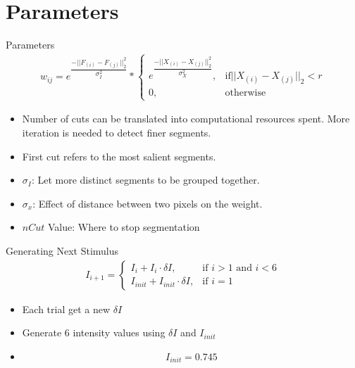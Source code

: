\documentclass[10pt,xcolor=svgnames]{beamer} %
\begin{document}
\section{Parameters}
\begin{frame}{Parameters}
    \begin{align}
        w_{ij} = e^{\dfrac{-||F_{(i)} - F_{(j)}||_2^2}{\sigma_I^2}}
        *
            \begin{cases}
            e^\dfrac{-||X_{(i)} - X_{(j)}||_2^2}{\sigma_X^2}, &  \text{if} ||X_{(i)} - X_{(j)}||_2 < r\\
            0,                                               &  \text{otherwise}
            \end{cases}
    \end{align}
    \begin{itemize}
        \item Number of cuts can be translated into computational resources spent. More iteration is needed to detect finer segments.
        \item First cut refers to the most salient segments.
        \item $\sigma_I$: Let more distinct segments to be grouped together.
        \item $\sigma_x$: Effect of distance between two pixels on the weight.
        \item $nCut$ Value: Where to stop segmentation
    \end{itemize}
\end{frame}

\begin{frame}{Generating Next Stimulus}
    \begin{align}
    I_{i+1} = 
        \begin{cases}
        I_i + I_i \cdot \delta I, & \text{if } i > 1 \text{ and } i < 6 \\
        I_{init} + I_{init} \cdot \delta I, & \text{if } i = 1
    \end{cases}
    \end{align}    

    \begin{itemize}
        \item Each trial get a new $\delta I$
        \item Generate 6 intensity values using $\delta I$ and $I_{init}$
        \item 
            \begin{equation}
                I_{init} = 0.745
            \end{equation}
    \end{itemize}
    
\end{frame}
\end{document}
